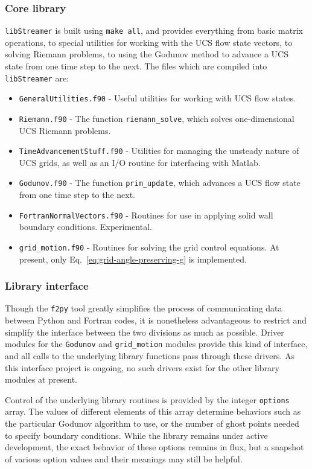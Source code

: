 \subsubsection{Core library}
{\tt libStreamer} is built using {\tt make all}, and provides everything from basic matrix operations, to special utilities for working with the UCS flow state vectors, to  solving Riemann problems, to using the Godunov method to advance a UCS state from one time step to the next. The files which are compiled into {\tt libStreamer} are:
\begin{itemize}
\item {\tt GeneralUtilities.f90} - Useful utilities for working with UCS flow states.
\item {\tt Riemann.f90} - The function {\tt riemann\_solve}, which solves one-dimensional UCS Riemann problems.
\item {\tt TimeAdvancementStuff.f90} - Utilities for managing the unsteady nature of UCS grids, as well as an I/O routine for interfacing with Matlab.
\item {\tt Godunov.f90} - The function {\tt prim\_update}, which advances a UCS flow state from one time step to the next.
\item {\tt FortranNormalVectors.f90} - Routines for use in applying solid wall boundary conditions. Experimental.
\item {\tt grid\_motion.f90} - Routines for solving the grid control equations. At present, only Eq.~\ref{eq:grid-angle-preserving-g} is implemented.
\end{itemize}

\subsubsection{Library interface}
Though the {\tt f2py} tool greatly simplifies the process of communicating data between Python and Fortran codes, it is nonetheless advantageous to restrict and simplify the interface between the two divisions as much as possible. Driver modules for the {\tt Godunov} and {\tt grid\_motion} modules provide this kind of interface, and all calls to the underlying library functions pass through these drivers. As this interface project is ongoing, no such drivers exist for the other library modules at present.

Control of the underlying library routines is provided by the integer {\tt options} array. The values of different elements of this array determine behaviors such as the particular Godunov algorithm to use, or the number of ghost points needed to specify boundary conditions. While the library remains under active development, the exact behavior of these options remains in flux, but a snapshot of various option values and their meanings may still be helpful.

